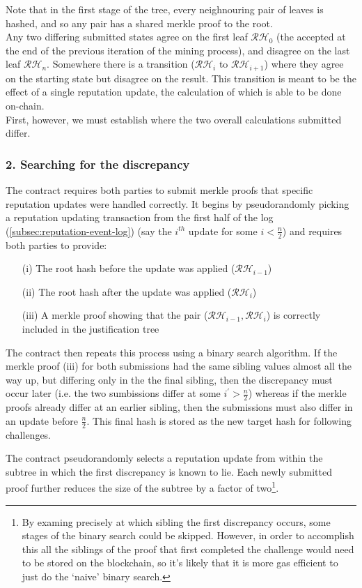 Note that in the first stage of the tree, every neighnouring pair of leaves is hashed, and so any pair has a shared merkle proof to the root.\\
Any two differing submitted states agree on the first leaf $\mathcal{RH}_0$ (the  accepted at the end of the previous iteration of the mining process), and disagree on the last leaf $\mathcal{RH}_n$. Somewhere there is a transition  ($\mathcal{RH}_i$ to $\mathcal{RH}_{i+1}$) where they agree on the starting state but disagree on the result. This transition is meant to be the effect of a single reputation update, the calculation of which is able to be done on-chain. \\
First, however, we must establish where the two overall calculations submitted differ.

\subsubsection*{2. Searching for the discrepancy}
The contract requires both parties to submit merkle proofs that specific reputation updates were handled correctly. It begins by pseudorandomly picking a reputation updating transaction from the first half of the log (\ref{subsec:reputation-event-log}) (say the $i^{th}$ update for some $i<\frac{n}{2}$) and requires both parties to provide:\\
\begin{itemize}
 \item[(i)] The root hash before the update was applied ($\mathcal{RH}_{i-1}$)
 \item[(ii)] The root hash after the update was applied ($\mathcal{RH}_i$)
 \item[(iii)] A merkle proof showing that the pair ($\mathcal{RH}_{i-1}, \mathcal{RH}_i$) is correctly included in the justification tree
\end{itemize}

The contract then repeats this process using a binary search algorithm. If the merkle proof (iii) for both submissions had the same sibling values almost all the way up, but differing only in the the final sibling, then the discrepancy must occur later (i.e. the two sumbissions differ at some $i^\prime > \frac{n}{2}$) whereas if the merkle proofs already differ at an earlier sibling, then the submissions must also differ in an update before $\frac{n}{2}$. This final hash is stored as the new target hash for following challenges.

The contract pseudorandomly selects a reputation update from within the subtree in which the first discrepancy is known to lie. Each newly submitted proof further reduces the size of the subtree by a factor of two\footnote{ By examing precisely at which sibling the first discrepancy occurs, some stages of the binary search could be skipped. However, in order to accomplish this all the siblings of the proof that first completed the challenge would need to be stored on the blockchain, so it’s likely that it is more gas efficient to just do the `naive' binary search.}.

